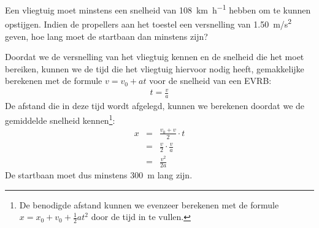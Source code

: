 \documentclass{ximera}
\begin{document}
\begin{exercise}
    Een vliegtuig moet minstens een snelheid van \SI{108}{\kilo\meter\per\hour} hebben om te kunnen opstijgen. Indien de propellers aan het toestel een versnelling van \SI{1,50}{m/s^2} geven, hoe lang moet de startbaan dan minstens zijn? 
    \begin{oplossing}
    Doordat we de versnelling van het vliegtuig kennen en de snelheid die het moet bereiken, kunnen we de tijd die het vliegtuig hiervoor nodig heeft, gemakkelijke berekenen met de formule $v=v_0+at$ voor de snelheid van een EVRB:
    \begin{eqnarray*}
        t=\frac{v}{a}
    \end{eqnarray*}
    De afstand die in deze tijd wordt afgelegd, kunnen we berekenen doordat we de gemiddelde snelheid kennen\footnote{De benodigde afstand kunnen we evenzeer berekenen met de formule $x=x_0+v_0+\frac{1}{2}at^2$ door de tijd in te vullen.}:
    \begin{eqnarray*}
    x&=&\frac{v_0+v}{2}\cdot t\\
    &=&\frac{v}{2}\cdot\frac{v}{a}\\
    &=&\frac{v^2}{2a}
    \end{eqnarray*}
    De startbaan moet dus minstens \SI{300}{m} lang zijn.
    \end{oplossing}
\end{exercise}
\end{document}
